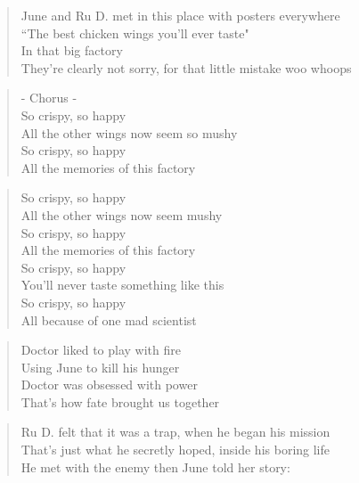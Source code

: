 \begin{verse}
June and Ru D. met in this place with posters everywhere\\
``The best chicken wings you'll ever taste"\\
In that big factory \\
They're clearly not sorry, for that little mistake woo whoops
\end{verse}

\begin{verse}
- Chorus -\\
So crispy, so happy\\
All the other wings now seem so mushy\\
So crispy, so happy\\
All the memories of this factory
\end{verse}

\begin{verse}
So crispy, so happy\\
All the other wings now seem mushy\\
So crispy, so happy\\
All the memories of this factory\\
So crispy, so happy\\
You'll never taste something like this\\
So crispy, so happy\\
All because of one mad scientist
\end{verse}

\begin{verse}
Doctor liked to play with fire\\
Using June to kill his hunger\\
Doctor was obsessed with power\\
That's how fate brought us together
\end{verse}

\begin{verse}
Ru D. felt that it was a trap, when he began his mission\\
That's just what he secretly hoped, inside his boring life\\
He met with the enemy then June told her story:
\end{verse}

\clearpage


